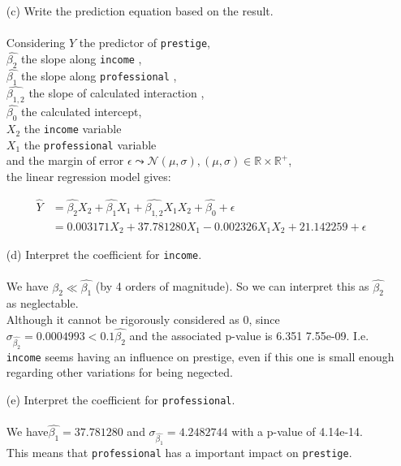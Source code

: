 \documentclass[12pt,letterpaper]{article}
\begin{document}
\begin{enumerate}
	\item [(c)]
	Write the prediction equation based on the result.\\
	\\
	Considering $\hat{Y}$ the predictor of \texttt{prestige}, \\
			 $\hat{\beta_2}$ the slope along \texttt{income} ,\\
			$\hat{\beta_1}$ the slope along \texttt{professional} ,\\
			$\hat{\beta_{1,2}}$ the slope of calculated interaction ,\\
			 $\hat{\beta_0}$ the calculated intercept,\\
			 $X_2$ the  \texttt{income} variable\\ 
			$X_1$ the  \texttt{professional} variable \\
			 and the margin of error $\epsilon \leadsto  \mathcal{N} ( \mu, \sigma ), ( \mu, \sigma ) \in \mathds{R} \times \mathds{R}^+$, \\
			 the linear regression model gives:
			
			\begin{align*}
				 \hat{Y} &= \hat{\beta_2} X_2 + \hat{\beta_1} X_1+ \hat{\beta_{1,2}} X_1 X_2 + \hat{\beta_0} + \epsilon \\
				&=     0.003171   X_2 +  37.781280  X_1 - 0.002326 X_1 X_2 +  21.142259       + \epsilon
			\end{align*}
	
	\item [(d)]
	Interpret the coefficient for \texttt{income}.\\
	\\
	We have $\hat{\beta_2} \ll \hat{\beta_1}$ (by 4 orders of magnitude). So we can interpret this as $\hat{\beta_2} $ as neglectable. \\
	Although it cannot be rigorously considered as 0, since $\sigma_{\hat{\beta_2}}=0.0004993 < 0.1\hat{\beta_2}$ and the associated p-value is 6.351 7.55e-09. 
	I.e. \texttt{income} seems having an  influence on prestige, even if this one is small enough regarding other variations for being negected.

	\item [(e)]
	Interpret the coefficient for \texttt{professional}.\\
	\\
	We have$ \hat{\beta_1} =  37.781280 $ and $\sigma_{\hat{\beta_1}}= 4.2482744$ with a p-value of 4.14e-14. \\
	This means that  \texttt{professional} has a important impact on \texttt{prestige}. 
	

\end{enumerate}
\end{document}
